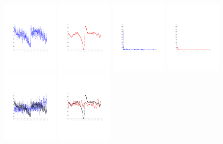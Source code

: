 \documentclass[12pt]{article}
\begin{document}
\begin{figure}[htb]
\includegraphics[width = 0.24\textwidth]{figures2/ts_before_1}
\includegraphics[width = 0.24\textwidth]{figures2/ts_after_1}
\includegraphics[width = 0.24\textwidth]{figures2/freq_before_1}
\includegraphics[width = 0.24\textwidth]{figures2/freq_after_1}\\
\includegraphics[width = 0.24\textwidth]{figures2/ts_before_2}
\includegraphics[width = 0.24\textwidth]{figures2/ts_after_2}

\end{figure}
\end{document}
